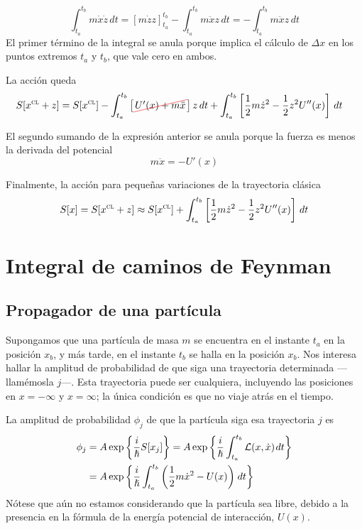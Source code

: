 \[
  \int_{t_a}^{t_b} m\dot{x}\dot{z}\,dt
  =
  \left[m\dot{z} z\right]_{t_a}^{t_b}
  - \int_{t_a}^{t_b} m\ddot{x} z\,dt
  =
  - \int_{t_a}^{t_b} m\ddot{x} z\,dt
\]
El primer término de la integral se anula porque implica el cálculo de
$\Delta x$ en los puntos extremos $t_a$ y $t_b$, que vale cero en
ambos.

La acción queda
\begin{align*}
  S[x^{\textsc{cl}}+z]
  &=
    S[x^{\textsc{cl}}]
    - \int_{t_a}^{t_b}\left[\cancelout{U'(x)+m\ddot{x}}\right] z\,dt
    + \int_{t_a}^{t_b}\left[\dfrac{1}{2}m\dot{z}^2-\dfrac{1}{2}z^2 U''(x)\right]\,dt
\end{align*}

El segundo sumando de la expresión anterior se anula porque la fuerza
es menos la derivada del potencial
\[
  m\ddot{x} = -U'(x)
\]

Finalmente, la acción para pequeñas variaciones de la trayectoria clásica
\begin{equation}\label{eq:accion_aprox_segundo_orden}
  S[x]
  =
  S[x^{\textsc{cl}}+z]
  \approx
  S[x^{\textsc{cl}}]
  + \int_{t_a}^{t_b}\left[\dfrac{1}{2}m\dot{z}^2-\dfrac{1}{2}z^2 U''(x)\right]\,dt
\end{equation}

\section{Integral de caminos de Feynman}
\subsection{Propagador de una partícula}
Supongamos que una partícula de masa $m$ se encuentra en el instante
$t_a$ en la posición $x_b$, y más tarde, en el instante $t_b$ se halla
en la posición $x_b$. Nos interesa hallar la amplitud de probabilidad
de que siga una trayectoria determinada ---llamémosla $j$---. Esta
trayectoria puede ser cualquiera, incluyendo las posiciones en
$x=-\infty$ y $x=\infty$; la única condición es que no viaje atrás en
el tiempo.

La amplitud de probabilidad $\phi_j$ de que la partícula siga esa
trayectoria $j$ es
\begin{align*}
  \phi_j
  &= A \exp\left\{\dfrac{i}{\hslash} S[x_j]\right\}
    = A \exp\left\{\frac{i}{\hslash} \int_{t_a}^{t_b} \mathcal{L}(x,\dot{x})\kern1pt dt\right\}\\
  &= A \exp\left\{\frac{i}{\hslash} \int_{t_a}^{t_b} \left(\dfrac{1}{2}m\dot{x}^2-U(x)\right)\kern1pt dt\right\}
\end{align*}
Nótese que aún no estamos considerando que la partícula sea libre,
debido a la presencia en la fórmula de la energía potencial de
interacción, $U(x)$.

